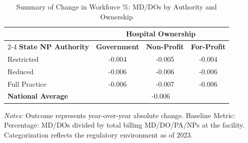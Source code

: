 \begin{table}[htbp]
    \centering
    \caption{Summary of Change in Workforce \%: MD/DOs by Authority and Ownership}
    \label{tab:d_pct_md_own}
    \vspace{0.2cm}
    \begin{tabular}{lccc}
        \toprule
        & \multicolumn{3}{c}{\textbf{Hospital Ownership}} \\
        \cmidrule(lr){2-4}
        \textbf{State NP Authority} & \textbf{Government} & \textbf{Non-Profit} & \textbf{For-Profit} \\
        \midrule
        Restricted & -0.004 & -0.005 & -0.004 \\
        Reduced & -0.006 & -0.006 & -0.006 \\
        Full Practice & -0.006 & -0.007 & -0.006 \\
        \midrule
        \textbf{National Average} & \multicolumn{3}{c}{-0.006} \\
        \bottomrule
    \end{tabular}
    \vspace{0.1cm}
    \begin{minipage}{0.85\textwidth}
        \footnotesize \textit{Notes:} Outcome represents year-over-year absolute change. Baseline Metric: Percentage: MD/DOs divided by total billing MD/DO/PA/NPs at the facility. Categorization reflects the regulatory environment as of 2023.
    \end{minipage}
\end{table}